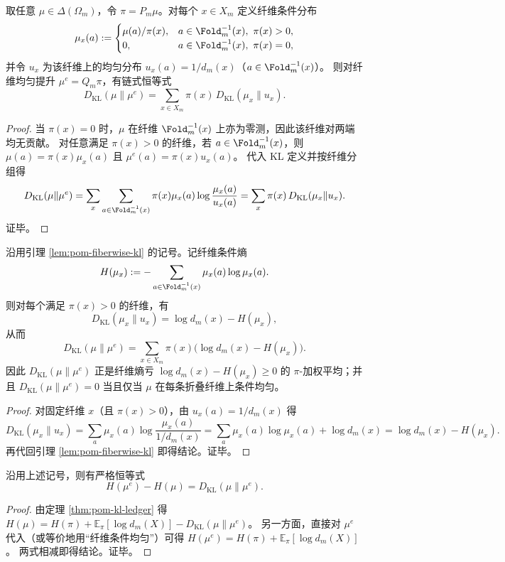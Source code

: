 \begin{lemma}[纤维 KL 分解：残差为纤维内非均匀的平均]\label{lem:pom-fiberwise-kl}
取任意 $\mu\in\Delta(\Omega_m)$，令 $\pi=P_m\mu$。对每个 $x\in X_m$ 定义纤维条件分布
\[
\mu_x(a):=
\begin{cases}
\mu(a)/\pi(x),& a\in \Fold_m^{-1}(x),\ \pi(x)>0,\\
0,& a\in \Fold_m^{-1}(x),\ \pi(x)=0,
\end{cases}
\]
并令 $u_x$ 为该纤维上的均匀分布 $u_x(a)=1/d_m(x)$（$a\in\Fold_m^{-1}(x)$）。
则对纤维均匀提升 $\mu^e=Q_m\pi$，有链式恒等式
\[
\boxed{\;
D_{\mathrm{KL}}(\mu\|\mu^e)=\sum_{x\in X_m}\pi(x)\,D_{\mathrm{KL}}(\mu_x\|u_x).
\;}
\]
\end{lemma}
\begin{proof}
当 $\pi(x)=0$ 时，$\mu$ 在纤维 $\Fold_m^{-1}(x)$ 上亦为零测，因此该纤维对两端均无贡献。
对任意满足 $\pi(x)>0$ 的纤维，若 $a\in\Fold_m^{-1}(x)$，则
\(
\mu(a)=\pi(x)\mu_x(a)
\)
且
\(
\mu^e(a)=\pi(x)u_x(a)
\)。
代入 KL 定义并按纤维分组得
\[
D_{\mathrm{KL}}(\mu\|\mu^e)
=\sum_{x}\sum_{a\in\Fold_m^{-1}(x)}\pi(x)\mu_x(a)\log\frac{\mu_x(a)}{u_x(a)}
=\sum_x \pi(x)\,D_{\mathrm{KL}}(\mu_x\|u_x).
\]
证毕。
\end{proof}

\begin{corollary}\label{cor:pom-fiber-entropy-deficit}
沿用引理 \ref{lem:pom-fiberwise-kl} 的记号。记纤维条件熵
\[
H(\mu_x):=-\sum_{a\in\Fold_m^{-1}(x)}\mu_x(a)\log \mu_x(a).
\]
则对每个满足 $\pi(x)>0$ 的纤维，有
\[
D_{\mathrm{KL}}(\mu_x\|u_x)=\log d_m(x)-H(\mu_x),
\]
从而
\[
\boxed{\;
D_{\mathrm{KL}}(\mu\|\mu^e)
=\sum_{x\in X_m}\pi(x)\bigl(\log d_m(x)-H(\mu_x)\bigr).
\;}
\]
因此 $D_{\mathrm{KL}}(\mu\|\mu^e)$ 正是纤维熵亏 \(\log d_m(x)-H(\mu_x)\ge 0\) 的 \(\pi\)-加权平均；并且 $D_{\mathrm{KL}}(\mu\|\mu^e)=0$ 当且仅当 $\mu$ 在每条折叠纤维上条件均匀。
\end{corollary}

\begin{proof}
对固定纤维 \(x\)（且 \(\pi(x)>0\)），由 \(u_x(a)=1/d_m(x)\) 得
\[
D_{\mathrm{KL}}(\mu_x\|u_x)
=\sum_{a}\mu_x(a)\log\frac{\mu_x(a)}{1/d_m(x)}
=\sum_a \mu_x(a)\log\mu_x(a)+\log d_m(x)
=\log d_m(x)-H(\mu_x).
\]
再代回引理 \ref{lem:pom-fiberwise-kl} 即得结论。证毕。
\end{proof}

\begin{corollary}\label{cor:pom-ent-increase-equals-kl}
沿用上述记号，则有严格恒等式
\[
\boxed{\;
H(\mu^e)-H(\mu)=D_{\mathrm{KL}}(\mu\|\mu^e).
\;}
\]
\end{corollary}
\begin{proof}
由定理 \ref{thm:pom-kl-ledger} 得
\(
H(\mu)=H(\pi)+\mathbb{E}_{\pi}[\log d_m(X)]-D_{\mathrm{KL}}(\mu\|\mu^e)
\)。
另一方面，直接对 $\mu^e$ 代入（或等价地用“纤维条件均匀”）可得
\(
H(\mu^e)=H(\pi)+\mathbb{E}_{\pi}[\log d_m(X)]
\)。
两式相减即得结论。证毕。
\end{proof}

